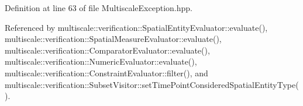 \-Definition at line 63 of file \-Multiscale\-Exception.\-hpp.



\-Referenced by multiscale\-::verification\-::\-Spatial\-Entity\-Evaluator\-::evaluate(), multiscale\-::verification\-::\-Spatial\-Measure\-Evaluator\-::evaluate(), multiscale\-::verification\-::\-Comparator\-Evaluator\-::evaluate(), multiscale\-::verification\-::\-Numeric\-Evaluator\-::evaluate(), multiscale\-::verification\-::\-Constraint\-Evaluator\-::filter(), and multiscale\-::verification\-::\-Subset\-Visitor\-::set\-Time\-Point\-Considered\-Spatial\-Entity\-Type().

